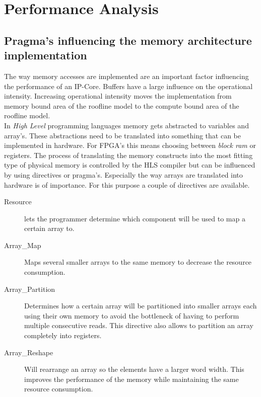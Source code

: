 \documentclass[../thesis.tex]{subfiles}
\begin{document}
\chapter{Performance Analysis}

\section{Pragma's influencing the memory architecture implementation}

The way memory accesses are implemented are an important factor influencing the performance of an IP-Core. Buffers have a large influence on the operational intensity. Increasing operational intensity moves the implementation from memory bound area of the roofline model to the compute bound area of the roofline model.\\
In \emph{High Level} programming languages memory gets abstracted to variables and array's. These abstractions need to be translated into something that can be implemented in hardware. For FPGA's this means choosing between \emph{block ram} or registers. The process of translating the memory constructs into the most fitting type of physical memory is controlled by the HLS compiler but can be influenced by using directives or pragma's. Especially the way arrays are translated into hardware is of importance. For this purpose a couple of directives are available.\\

\begin{description}

\item[Resource] lets the programmer determine which component will be used to map a certain array to.

\item[Array\_Map] Maps several smaller arrays to the same memory to decrease the resource consumption.

\item[Array\_Partition] Determines how a certain array will be partitioned into smaller arrays each using their own memory to avoid the bottleneck of having to perform multiple consecutive reads. This directive also allows to partition an array completely into registers.

\item[Array\_Reshape] Will rearrange an array so the elements have a larger word width. This improves the performance of the memory while maintaining the same resource consumption.

\end{description}
\end{document}
